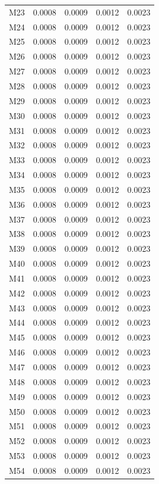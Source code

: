 \begin{longtable}{lrrrr}
M23 & 0.0008 & 0.0009 & 0.0012 & 0.0023 \\
M24 & 0.0008 & 0.0009 & 0.0012 & 0.0023 \\
M25 & 0.0008 & 0.0009 & 0.0012 & 0.0023 \\
M26 & 0.0008 & 0.0009 & 0.0012 & 0.0023 \\
M27 & 0.0008 & 0.0009 & 0.0012 & 0.0023 \\
M28 & 0.0008 & 0.0009 & 0.0012 & 0.0023 \\
M29 & 0.0008 & 0.0009 & 0.0012 & 0.0023 \\
M30 & 0.0008 & 0.0009 & 0.0012 & 0.0023 \\
M31 & 0.0008 & 0.0009 & 0.0012 & 0.0023 \\
M32 & 0.0008 & 0.0009 & 0.0012 & 0.0023 \\
M33 & 0.0008 & 0.0009 & 0.0012 & 0.0023 \\
M34 & 0.0008 & 0.0009 & 0.0012 & 0.0023 \\
M35 & 0.0008 & 0.0009 & 0.0012 & 0.0023 \\
M36 & 0.0008 & 0.0009 & 0.0012 & 0.0023 \\
M37 & 0.0008 & 0.0009 & 0.0012 & 0.0023 \\
M38 & 0.0008 & 0.0009 & 0.0012 & 0.0023 \\
M39 & 0.0008 & 0.0009 & 0.0012 & 0.0023 \\
M40 & 0.0008 & 0.0009 & 0.0012 & 0.0023 \\
M41 & 0.0008 & 0.0009 & 0.0012 & 0.0023 \\
M42 & 0.0008 & 0.0009 & 0.0012 & 0.0023 \\
M43 & 0.0008 & 0.0009 & 0.0012 & 0.0023 \\
M44 & 0.0008 & 0.0009 & 0.0012 & 0.0023 \\
M45 & 0.0008 & 0.0009 & 0.0012 & 0.0023 \\
M46 & 0.0008 & 0.0009 & 0.0012 & 0.0023 \\
M47 & 0.0008 & 0.0009 & 0.0012 & 0.0023 \\
M48 & 0.0008 & 0.0009 & 0.0012 & 0.0023 \\
M49 & 0.0008 & 0.0009 & 0.0012 & 0.0023 \\
M50 & 0.0008 & 0.0009 & 0.0012 & 0.0023 \\
M51 & 0.0008 & 0.0009 & 0.0012 & 0.0023 \\
M52 & 0.0008 & 0.0009 & 0.0012 & 0.0023 \\
M53 & 0.0008 & 0.0009 & 0.0012 & 0.0023 \\
M54 & 0.0008 & 0.0009 & 0.0012 & 0.0023 \\

\end{longtable}
